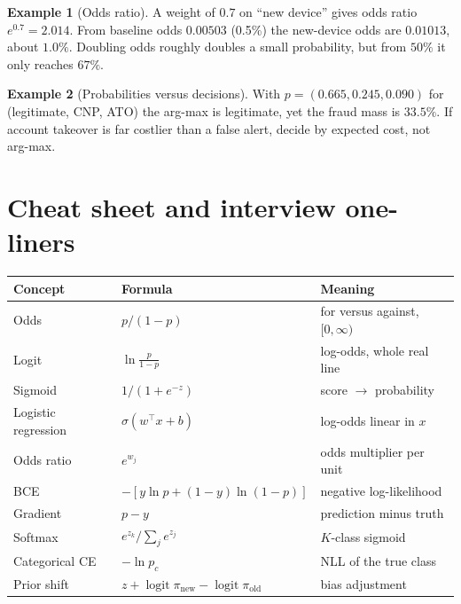 \documentclass[11pt,a4paper]{article}
\DeclareMathOperator{\logit}{logit}
\theoremstyle{definition}
\newtheorem{example}{Example}
\begin{document}
\begin{example}[Odds ratio]
A weight of $0.7$ on ``new device'' gives odds ratio $e^{0.7}=2.014$. From baseline odds $0.00503$ (0.5\%) the new-device odds are $0.01013$, about $1.0\%$. Doubling odds roughly doubles a small probability, but from $50\%$ it only reaches $67\%$.
\end{example}

\begin{example}[Probabilities versus decisions]
With $p=(0.665,0.245,0.090)$ for (legitimate, CNP, ATO) the arg-max is legitimate, yet the fraud mass is $33.5\%$. If account takeover is far costlier than a false alert, decide by expected cost, not arg-max.
\end{example}

\section{Cheat sheet and interview one-liners}

\begin{table}[h]
\centering\small
\begin{tabular}{lll}
\toprule
Concept & Formula & Meaning\\
\midrule
Odds & $p/(1-p)$ & for versus against, $[0,\infty)$\\
Logit & $\ln\frac{p}{1-p}$ & log-odds, whole real line\\
Sigmoid & $1/(1+e^{-z})$ & score $\to$ probability\\
Logistic regression & $\sigma(w^\top x+b)$ & log-odds linear in $x$\\
Odds ratio & $e^{w_j}$ & odds multiplier per unit\\
BCE & $-[y\ln p+(1-y)\ln(1-p)]$ & negative log-likelihood\\
Gradient & $p-y$ & prediction minus truth\\
Softmax & $e^{z_k}/\sum_j e^{z_j}$ & $K$-class sigmoid\\
Categorical CE & $-\ln p_c$ & NLL of the true class\\
Prior shift & $z+\logit\pi_{\text{new}}-\logit\pi_{\text{old}}$ & bias adjustment\\
\bottomrule
\end{tabular}
\end{table}
\end{document}
